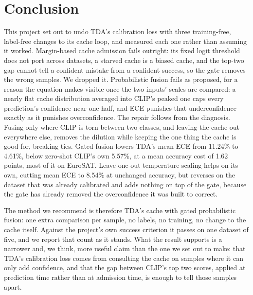 \section{Conclusion}

This project set out to undo TDA's calibration loss with three training-free, label-free
changes to its cache loop, and measured each one rather than assuming it worked. Margin-based
cache admission fails outright: its fixed logit threshold does not port across datasets, a
starved cache is a biased cache, and the top-two gap cannot tell a confident mistake from a
confident success, so the gate removes the wrong samples. We dropped it. Probabilistic fusion
fails as proposed, for a reason the equation makes visible once the two inputs' scales are
compared: a nearly flat cache distribution averaged into CLIP's peaked one caps every
prediction's confidence near one half, and ECE punishes that underconfidence exactly as it
punishes overconfidence. The repair follows from the diagnosis. Fusing only where CLIP is torn
between two classes, and leaving the cache out everywhere else, removes the dilution while
keeping the one thing the cache is good for, breaking ties. Gated fusion lowers TDA's mean ECE
from 11.24\% to 4.61\%, below zero-shot CLIP's own 5.57\%, at a mean accuracy cost of 1.62
points, most of it on EuroSAT. Leave-one-out temperature scaling helps on its own, cutting mean
ECE to 8.54\% at unchanged accuracy, but reverses on the dataset that was already calibrated
and adds nothing on top of the gate, because the gate has already removed the overconfidence it
was built to correct.

The method we recommend is therefore TDA's cache with gated probabilistic fusion: one extra
comparison per sample, no labels, no training, no change to the cache itself. Against the
project's own success criterion it passes on one dataset of five, and we report that count as
it stands. What the result supports is a narrower and, we think, more useful claim than the one
we set out to make: that TDA's calibration loss comes from consulting the cache on samples
where it can only add confidence, and that the gap between CLIP's top two scores, applied at
prediction time rather than at admission time, is enough to tell those samples apart.
